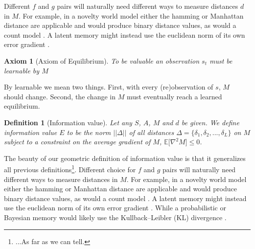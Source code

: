 \documentclass[9pt,lineno]{elife}
\newtheorem{axiom}{Axiom}
\newtheorem{definition}{Definition}
\begin{document}
Different $f$ and $g$ pairs will naturally need different ways to measure distances $d$ in $M$. For example, in a novelty world model \cite{Kakade2002} either the hamming or Manhattan distance are applicable and would produce binary distance values, as would a count model \cite{Bellemare2016,Dayan1993}. A latent memory \cite{Schmidhuber1991,Pathak2017} might instead use the euclidean norm of its own error gradient \cite{Pascanu2013}. 

\begin{axiom}
	[Axiom of Equilibrium] To be valuable an observation $s_t$ must be learnable by $M$ 
\label{ax:5} 
\end{axiom}

\noindent By learnable we mean two things. First, with every (re)observation of $s$, $M$ should change. Second, the change in $M$ must eventually reach a learned equilibrium. 

\begin{definition}[Information value] Let any $S$, $A$, $M$ and $d$ be given. We define information value $E$ to be the norm $||\Delta||$ of all distances $\Delta = \{\delta_1, \delta_2,...,\delta_L\}$ on $M$ subject to a constraint on the average gradient of $M$, $\mathbb{E}\big [\nabla^2 M \big ] \leq 0$. 
\end{definition}


The beauty of our geometric definition of information value is that it generalizes all previous definitions\footnote{...As far as we can tell.}. Different choice for $f$ and $g$ pairs will naturally need different ways to measure distances in $M$. For example, in a novelty world model \citep{Kakade2002} either the hamming or Manhattan distance are applicable and would produce binary distance values, as would a count model \citep{Bellemare2016,Dayan1993}. A latent memory \citep{Schmidhuber1991,Pathak2017} might instead use the euclidean norm of its own error gradient \citep{Pascanu2013}. While a probabilistic or Bayesian memory would likely use the Kullback–Leibler (KL) divergence \citep{Park2017,Friston2016}.
\end{document}
